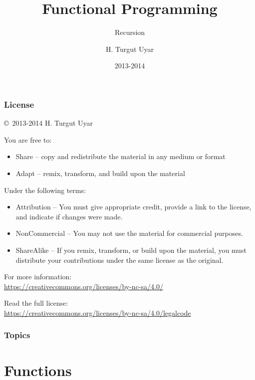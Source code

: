 \documentclass[dvipsnames]{beamer}
\title{Functional Programming}
\subtitle{Recursion}
\author{H. Turgut Uyar}
\date{2013-2014}
\theoremstyle{plain}
\begin{document}

\begin{frame}
  \titlepage
\end{frame}

\begin{frame}
  \frametitle{License}

  \hfill
  \copyright~2013-2014 H. Turgut Uyar

  \vfill
  \begin{footnotesize}
    You are free to:
    \begin{itemize}
      \itemsep0em
      \item Share -- copy and redistribute the material in any medium or format
      \item Adapt -- remix, transform, and build upon the material
    \end{itemize}

    Under the following terms:
    \begin{itemize}
      \itemsep0em
      \item Attribution -- You must give appropriate credit, provide a link to
        the license, and indicate if changes were made.

      \item NonCommercial -- You may not use the material for commercial
        purposes.

      \item ShareAlike -- If you remix, transform, or build upon the material,
        you must distribute your contributions under the same license as the
        original.
    \end{itemize}
  \end{footnotesize}

  \begin{small}
    For more information:\\
    \url{https://creativecommons.org/licenses/by-nc-sa/4.0/}

    \smallskip
    Read the full license:\\
    \url{https://creativecommons.org/licenses/by-nc-sa/4.0/legalcode}
  \end{small}
\end{frame}

\begin{frame}
  \frametitle{Topics}
  \tableofcontents
\end{frame}

\section{Functions}
\end{document}
